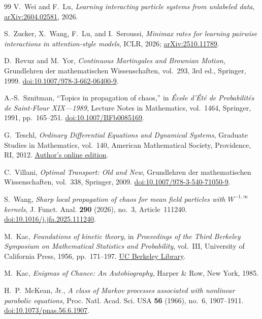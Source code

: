 \documentclass[11pt]{amsart}
\numberwithin{equation}{section}
\theoremstyle{plain}
\begin{document}
\begin{thebibliography}{99}
V.~Wei and F.~Lu,
\emph{Learning interacting particle systems from unlabeled data},
\href{https://arxiv.org/abs/2604.02581}{arXiv:2604.02581}, 2026.

S.~Zucker, X.~Wang, F.~Lu, and I.~Seroussi,
\emph{Minimax rates for learning pairwise interactions in attention-style
models},
ICLR, 2026;
\href{https://arxiv.org/abs/2510.11789}{arXiv:2510.11789}.

D.~Revuz and M.~Yor,
\emph{Continuous Martingales and Brownian Motion},
Grundlehren der mathematischen Wissenschaften, vol.~293, 3rd ed.,
Springer, 1999.
\href{https://doi.org/10.1007/978-3-662-06400-9}
{doi:10.1007/978-3-662-06400-9}.

A.-S.~Sznitman,
``Topics in propagation of chaos,'' in
\emph{\'Ecole d'\'Et\'e de Probabilit\'es de Saint-Flour XIX---1989},
Lecture Notes in Mathematics, vol.~1464, Springer, 1991, pp.~165--251.
\href{https://doi.org/10.1007/BFb0085169}{doi:10.1007/BFb0085169}.

G.~Teschl,
\emph{Ordinary Differential Equations and Dynamical Systems},
Graduate Studies in Mathematics, vol.~140,
American Mathematical Society, Providence, RI, 2012.
\href{https://www.mat.univie.ac.at/~gerald/ftp/book-ode/ode.pdf}
{Author's online edition}.

C.~Villani,
\emph{Optimal Transport: Old and New},
Grundlehren der mathematischen Wissenschaften, vol.~338,
Springer, 2009.
\href{https://doi.org/10.1007/978-3-540-71050-9}
{doi:10.1007/978-3-540-71050-9}.

S.~Wang,
\emph{Sharp local propagation of chaos for mean field particles with
$W^{-1,\infty}$ kernels},
J. Funct. Anal. \textbf{290} (2026), no.~3, Article~111240.
\href{https://doi.org/10.1016/j.jfa.2025.111240}
{doi:10.1016/j.jfa.2025.111240}.

M.~Kac,
\emph{Foundations of kinetic theory},
in \emph{Proceedings of the Third Berkeley Symposium on Mathematical
Statistics and Probability}, vol.~III, University of California Press,
1956, pp.~171--197.
\href{https://digicoll.lib.berkeley.edu/record/112857}
{UC Berkeley Library}.

M.~Kac,
\emph{Enigmas of Chance: An Autobiography},
Harper \& Row, New York, 1985.

H.~P.~McKean, Jr.,
\emph{A class of Markov processes associated with nonlinear parabolic
equations},
Proc. Natl. Acad. Sci. USA \textbf{56} (1966), no.~6, 1907--1911.
\href{https://doi.org/10.1073/pnas.56.6.1907}
{doi:10.1073/pnas.56.6.1907}.


\end{thebibliography}
\end{document}
